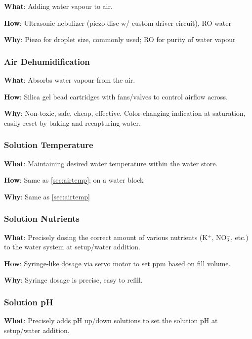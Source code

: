 \documentclass{report}
\begin{document}
\begin{itemize}
\textbf{What}: Adding water vapour to air.

\textbf{How}: Ultrasonic nebulizer (piezo disc w/ custom driver circuit), RO water

\textbf{Why}: Piezo for droplet size, commonly used; RO for purity of water vapour

\newpage

\subsubsection{Air Dehumidification}
\label{sec:dehum}

\textbf{What}: Absorbs water vapour from the air.

\textbf{How}: Silica gel bead cartridges with fans/valves to control airflow across.

\textbf{Why}: Non-toxic, safe, cheap, effective. Color-changing indication at saturation, easily reset by baking and recapturing water.

\subsubsection{Solution Temperature}
\label{sec:watertemp}

\textbf{What}: Maintaining desired water temperature within the water store.

\textbf{How}: Same as \ref{sec:airtemp}; on a water block

\textbf{Why}: Same as \ref{sec:airtemp}

\subsubsection{Solution Nutrients}
\label{sec:nutrients}

\textbf{What}: Precisely dosing the correct amount of various nutrients (K${}^+$, NO${}_3^-$, etc.) to the water system at setup/water addition.


\textbf{How}: Syringe-like dosage via servo motor to set ppm based on fill volume.

\textbf{Why}: Syringe dosage is precise, easy to refill.

\subsubsection{Solution pH}
\label{sec:ph}

\textbf{What}: Precisely adds pH up/down solutions to set the solution pH at setup/water addition.


\end{itemize}
\end{document}
